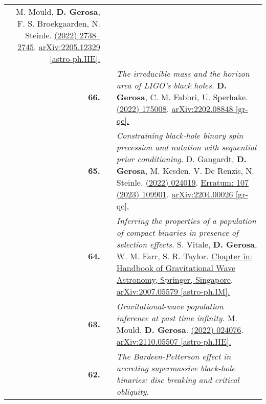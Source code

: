 {\begin{longtable}{rp{0.3cm}p{15.8cm}}
M. Mould, \textbf{D. Gerosa}, F. S. Broekgaarden, N. Steinle.
\newline{}
\href{https://doi.org/10.1093/mnras/stac2859}{\mnras 517 (2022) 2738–2745}. \href{https://arxiv.org/abs/2205.12329}{arXiv:2205.12329 [astro-ph.HE].}
\vspace{0.09cm}\\
%
\textbf{66.} & & \textit{The irreducible mass and the horizon area of LIGO's black holes.}
\newline{}
\textbf{D. Gerosa}, C. M. Fabbri, U. Sperhake.
\newline{}
\href{https://iopscience.iop.org/article/10.1088/1361-6382/ac8332}{\cqg 39 (2022) 175008}. \href{https://arxiv.org/abs/2202.08848}{arXiv:2202.08848 [gr-qc].}
\vspace{0.09cm}\\
%
\textbf{65.} & & \textit{Constraining black-hole binary spin precession and nutation with sequential prior conditioning.}
\newline{}
D. Gangardt, \textbf{D. Gerosa}, M. Kesden, V. De Renzis, N. Steinle.
\newline{}
\href{https://journals.aps.org/prd/abstract/10.1103/PhysRevD.106.024019}{\prd 106 (2022) 024019}. \href{https://journals.aps.org/prd/abstract/10.1103/PhysRevD.107.109901}{Erratum: 107 (2023) 109901}. \href{https://arxiv.org/abs/2204.00026}{arXiv:2204.00026 [gr-qc].}
\vspace{0.09cm}\\
%
\textbf{64.} & & \textit{Inferring the properties of a population of compact binaries in presence of selection effects.}
\newline{}
S. Vitale, \textbf{D. Gerosa}, W. M. Farr, S. R. Taylor.
\newline{}
\href{https://doi.org/10.1007/978-981-15-4702-7_45-1}{Chapter in: Handbook of Gravitational Wave Astronomy, Springer, Singapore}. \href{https://arxiv.org/abs/2007.05579}{arXiv:2007.05579 [astro-ph.IM].}
\vspace{0.09cm}\\
%
\textbf{63.} & & \textit{Gravitational-wave population inference at past time infinity.}
\newline{}
M. Mould, \textbf{D. Gerosa}.
\newline{}
\href{https://journals.aps.org/prd/abstract/10.1103/PhysRevD.105.024076}{\prd 105 (2022) 024076}. \href{https://arxiv.org/abs/2110.05507}{arXiv:2110.05507 [astro-ph.HE].}
\vspace{0.09cm}\\
%
\textbf{62.} & & \textit{The Bardeen-Petterson effect in accreting supermassive black-hole binaries: disc breaking and critical obliquity.}

\end{longtable}}
